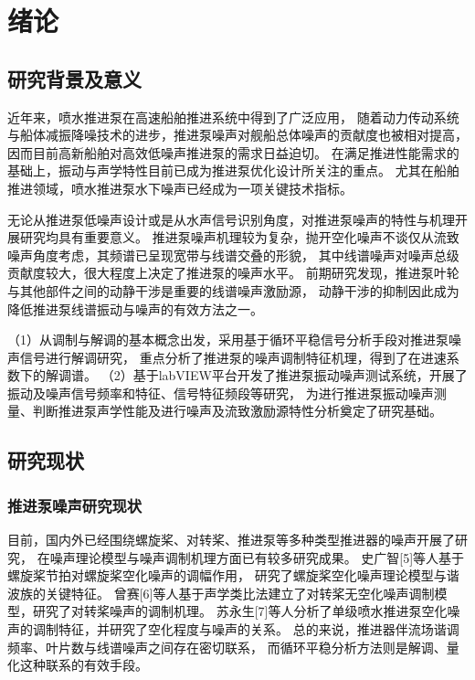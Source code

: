 \chapter{绪论}

\section{研究背景及意义}
近年来，喷水推进泵在高速船舶推进系统中得到了广泛应用，
随着动力传动系统与船体减振降噪技术的进步，推进泵噪声对舰船总体噪声的贡献度也被相对提高，
因而目前高新船舶对高效低噪声推进泵的需求日益迫切。
在满足推进性能需求的基础上，振动与声学特性目前已成为推进泵优化设计所关注的重点。
尤其在船舶推进领域，喷水推进泵水下噪声已经成为一项关键技术指标。

无论从推进泵低噪声设计或是从水声信号识别角度，对推进泵噪声的特性与机理开展研究均具有重要意义。
推进泵噪声机理较为复杂，抛开空化噪声不谈仅从流致噪声角度考虑，其频谱已呈现宽带与线谱交叠的形貌，
其中线谱噪声对噪声总级贡献度较大，很大程度上决定了推进泵的噪声水平。
前期研究发现，推进泵叶轮与其他部件之间的动静干涉是重要的线谱噪声激励源，
动静干涉的抑制因此成为降低推进泵线谱振动与噪声的有效方法之一。

（1）从调制与解调的基本概念出发，采用基于循环平稳信号分析手段对推进泵噪声信号进行解调研究，
重点分析了推进泵的噪声调制特征机理，得到了在进速系数下的解调谱。
（2）基于labVIEW平台开发了推进泵振动噪声测试系统，开展了振动及噪声信号频率和特征、信号特征频段等研究，
为进行推进泵振动噪声测量、判断推进泵声学性能及进行噪声及流致激励源特性分析奠定了研究基础。 


\section{研究现状}
\subsection{推进泵噪声研究现状}
目前，国内外已经围绕螺旋桨、对转桨、推进泵等多种类型推进器的噪声开展了研究，
在噪声理论模型与噪声调制机理方面已有较多研究成果。
史广智[5]等人基于螺旋桨节拍对螺旋桨空化噪声的调幅作用，
研究了螺旋桨空化噪声理论模型与谐波族的关键特征。
曾赛[6]等人基于声学类比法建立了对转桨无空化噪声调制模型，研究了对转桨噪声的调制机理。
苏永生[7]等人分析了单级喷水推进泵空化噪声的调制特征，并研究了空化程度与噪声的关系。
总的来说，推进器伴流场谐调频率、叶片数与线谱噪声之间存在密切联系，
而循环平稳分析方法则是解调、量化这种联系的有效手段。

